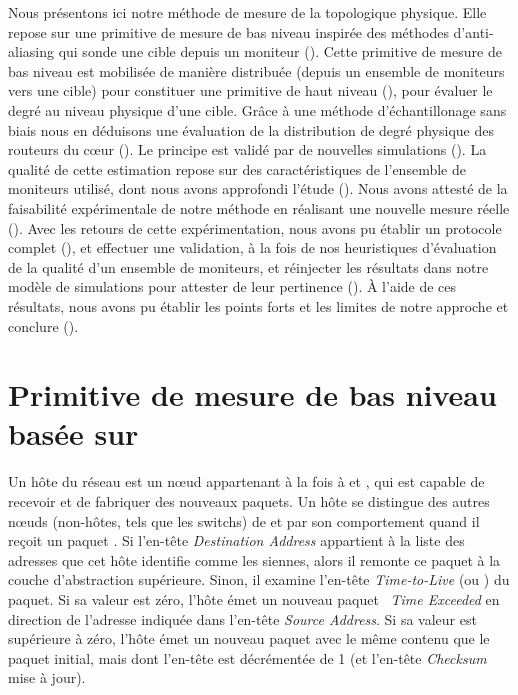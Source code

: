 Nous présentons ici notre méthode de mesure de la topologique physique. Elle
repose sur une primitive de mesure de bas niveau \udpping inspirée des méthodes
d'anti-aliasing qui sonde une cible depuis un moniteur
(). Cette primitive de mesure de bas niveau est
mobilisée de manière distribuée (depuis un ensemble de moniteurs vers une cible)
pour constituer une primitive de haut niveau (),
pour évaluer le degré au niveau physique d'une cible. Grâce à une méthode
d'échantillonage sans biais nous en déduisons une évaluation de la distribution
de degré physique des routeurs du c\oe{}ur (). Le
principe est validé par de nouvelles simulations ().
La qualité de cette estimation repose sur des caractéristiques de l'ensemble de
moniteurs utilisé, dont nous avons approfondi l'étude
(). Nous avons attesté de la faisabilité expérimentale
de notre méthode en réalisant une nouvelle mesure réelle
(). Avec les retours de cette expérimentation, nous
avons pu établir un protocole complet (), et effectuer
une validation, à la fois de nos heuristiques d'évaluation de la qualité d'un
ensemble de moniteurs, et réinjecter les résultats dans notre modèle de
simulations pour attester de leur pertinence (). À
l'aide de ces résultats, nous avons pu établir les points forts et les limites
de notre approche et conclure ().

\section{Primitive de mesure de bas niveau basée sur \udpping}
\label{sec:udpping-one-to-one}

Un hôte du réseau est un n\oe{}ud appartenant à la fois à \LLL et \LL, qui est
capable de recevoir et de fabriquer des nouveaux paquets. Un hôte se distingue
des autres n\oe{}uds (non-hôtes, tels que les switchs) de \LLL et \LL par son
comportement quand il reçoit un paquet \ip{}. Si l'en-tête {\em
Destination Address} appartient à la liste des adresses que cet hôte identifie
comme les siennes, alors il remonte ce paquet à la couche d'abstraction
supérieure. Sinon, il examine l'en-tête {\em Time-to-Live} (ou \ttl) du paquet.
Si sa valeur est zéro, l'hôte émet un nouveau paquet \icmp~{\em Time Exceeded}
en direction de l'adresse indiquée dans l'en-tête {\em Source Address}. Si sa
valeur est supérieure à zéro, l'hôte émet un nouveau paquet \ip avec le même
contenu que le paquet initial, mais dont l'en-tête \ttl est décrémentée de 1 (et
l'en-tête {\em Checksum} mise à jour).

